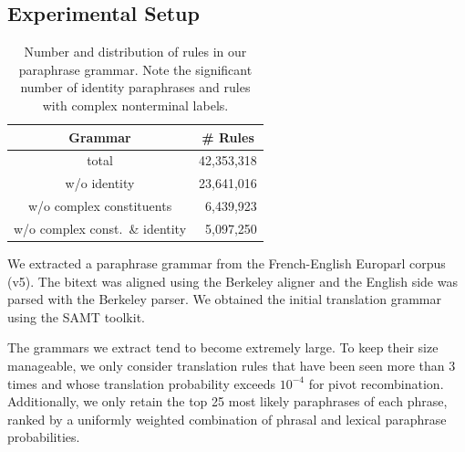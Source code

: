 \documentclass[11pt]{article}
\begin{document}

\subsection{Experimental Setup}
\label{setup}

\begin{table}
\small
\begin{center}
\begin{tabular}{|c|r|}
  \hline
  Grammar & \multicolumn{1}{c|}{\# Rules} \\
  \hline
  total & 42,353,318 \\
  w/o identity & 23,641,016 \\
  w/o complex constituents & 6,439,923 \\
  w/o complex const.\ \& identity & 5,097,250 \\
  \hline
\end{tabular}
\end{center}
\normalsize
\caption{Number and distribution of rules in our paraphrase
  grammar. Note the significant number of identity paraphrases and
  rules with complex nonterminal labels.}
\label{grammar_stats}
\end{table}

We extracted a paraphrase grammar from the French-English Europarl
corpus (v5). The bitext was aligned using the Berkeley aligner and the
English side was parsed with the Berkeley parser. We obtained the
initial translation grammar using the SAMT toolkit.

The grammars we extract tend to become extremely large. To keep their
size manageable, we only consider translation rules that have been
seen more than 3 times and whose translation probability exceeds
$10^{-4}$ for pivot recombination. Additionally, we only retain the
top 25 most likely paraphrases of each phrase, ranked by a uniformly
weighted combination of phrasal and lexical paraphrase probabilities.
\end{document}
